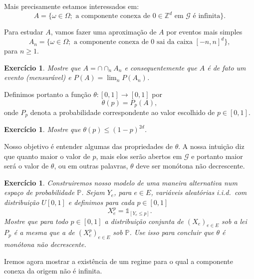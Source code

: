 \documentclass[reqno, draft]{book}
\newcommand*\1{\mathds{1}}
\newtheorem{exercise}[example]{Exercício}
\def \iid{i.i.d.~}
\begin{document}
Mais precisamente estamos interessados em:
\begin{equation}
  A = \big\{\omega \in \Omega; \text{ a componente conexa de $0 \in \mathbb{Z}^d$ em $\mathcal{G}$ é infinita} \big\}.
\end{equation}

Para estudar $A$, vamos fazer uma aproximação de $A$ por eventos mais simples
\begin{equation}
  A_n = \big\{ \omega \in \Omega; \text{ a componente conexa de $0$ sai da caixa $[-n, n]^d$}\},
\end{equation}
para $n \geq 1$.

\begin{exercise}
  Mostre que $A = \cap \cap_n A_n$ e consequentemente que $A$ é de fato um evento (mensurável) e $P(A) = \lim_n P(A_n)$.
\end{exercise}

Definimos portanto a função $\theta:[0,1] \to [0,1]$ por
\begin{equation}
  \theta(p) = P_p(A),
\end{equation}
onde $P_p$ denota a probabilidade correspondente ao valor escolhido de $p \in [0,1]$.

\begin{exercise}
  Mostre que $\theta(p) \leq (1-p)^{2d}$.
\end{exercise}

Nosso objetivo é entender algumas das propriedades de $\theta$.
A nossa intuição diz que quanto maior o valor de $p$, mais elos serão abertos em $\mathcal{G}$ e portanto maior será o valor de $\theta$, ou em outras palavras, $\theta$ deve ser monótona não decrescente.

\begin{exercise}
  Construiremos nosso modelo de uma maneira alternativa num espaço de probabilidade $\mathbb{P}$.
  Sejam $Y_e$, para $e \in E$, variáveis aleatórias \iid com distribuição $U[0,1]$ e definimos para cada $p \in [0,1]$
  \begin{equation}
    X^p_e = \1_{[Y_e \leq p]}.
  \end{equation}
  Mostre que para todo $p \in [0,1]$ a distribuição conjunta de $(X_e)_{e \in E}$ sob a lei $P_p$ é a mesma que a de $(X^p_e)_{e \in E}$ sob $\mathbb{P}$.
  Use isso para concluir que $\theta$ é monótona não decrescente.
\end{exercise}

Iremos agora mostrar a existência de um regime para o qual a componente conexa da origem não é infinita.
\end{document}
